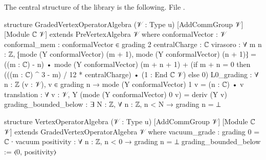 \begin{example}\label{ch01:ex:VOA}
The central structure of the library is the following.
\noindent File .
\begin{leancode}
structure GradedVertexOperatorAlgebra (𝒱 : Type u) [AddCommGroup 𝒱] [Module ℂ 𝒱]
    extends PreVertexAlgebra 𝒱 where
  conformalVector : 𝒱
  conformal_mem : conformalVector ∈ grading 2
  centralCharge : ℂ
  virasoro : ∀ m n : ℤ,
      ⁅mode (Y conformalVector) (m + 1), mode (Y conformalVector) (n + 1)⁆
        = ((m : ℂ) - n) • mode (Y conformalVector) (m + n + 1)
          + (if m + n = 0 then (((m : ℂ) ^ 3 - m) / 12 * centralCharge) • (1 : End ℂ 𝒱)
             else 0)
  L0_grading : ∀ {n : ℤ} (v : 𝒱), v ∈ grading n → mode (Y conformalVector) 1 v = (n : ℂ) • v
  translation : ∀ v : 𝒱, Y (mode (Y conformalVector) 0 v) = deriv (Y v)
  grading_bounded_below : ∃ N : ℤ, ∀ n : ℤ, n < N → grading n = ⊥

structure VertexOperatorAlgebra (𝒱 : Type u) [AddCommGroup 𝒱] [Module ℂ 𝒱]
    extends GradedVertexOperatorAlgebra 𝒱 where
  vacuum_grade : grading 0 = ℂ ∙ vacuum
  positivity : ∀ n : ℤ, n < 0 → grading n = ⊥
  grading_bounded_below := ⟨0, positivity⟩


\end{leancode}
\end{example}
